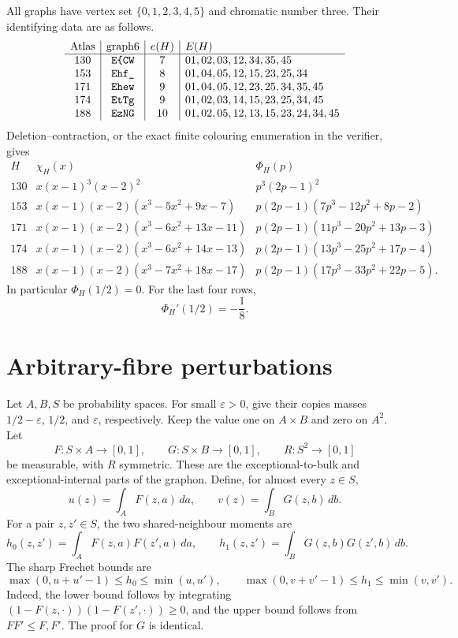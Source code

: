 \documentclass[11pt]{article}
\begin{document}
All graphs have vertex set $\{0,1,2,3,4,5\}$ and chromatic number three.
Their identifying data are as follows.
\[
\begin{array}{c|c|c|l}
\text{Atlas}&\text{graph6}&e(H)&E(H)\\ \hline
130&\texttt{E\char`\{CW}&7&01,02,03,12,34,35,45\\
153&\texttt{Ehf\_}&8&01,04,05,12,15,23,25,34\\
171&\texttt{Ehew}&9&01,04,05,12,23,25,34,35,45\\
174&\texttt{EtTg}&9&01,02,03,14,15,23,25,34,45\\
188&\texttt{EzNG}&10&01,02,05,12,13,15,23,24,34,45
\end{array}
\]
Deletion--contraction, or the exact finite colouring enumeration in the
verifier, gives
\[
\begin{array}{c|l|l}
H&\chi_H(x)&\Phi_H(p)\\ \hline
130&x(x-1)^3(x-2)^2&p^3(2p-1)^2\\
153&x(x-1)(x-2)(x^3-5x^2+9x-7)&
 p(2p-1)(7p^3-12p^2+8p-2)\\
171&x(x-1)(x-2)(x^3-6x^2+13x-11)&
 p(2p-1)(11p^3-20p^2+13p-3)\\
174&x(x-1)(x-2)(x^3-6x^2+14x-13)&
 p(2p-1)(13p^3-25p^2+17p-4)\\
188&x(x-1)(x-2)(x^3-7x^2+18x-17)&
 p(2p-1)(17p^3-33p^2+22p-5).
\end{array}
\]
In particular $\Phi_H(1/2)=0$.  For the last four rows,
\begin{equation}
 \Phi_H'(1/2)=-\frac18.
 \label{eq:negative-slope}
\end{equation}

\section{Arbitrary-fibre perturbations}

Let $A,B,S$ be probability spaces.  For small $\varepsilon>0$, give their
copies masses $1/2-\varepsilon$, $1/2$, and $\varepsilon$, respectively.
Keep the value one on $A\times B$ and zero on $A^2$.  Let
\[
 F:S\times A\longrightarrow[0,1],\qquad
 G:S\times B\longrightarrow[0,1],\qquad
 R:S^2\longrightarrow[0,1]
\]
be measurable, with $R$ symmetric.  These are the exceptional-to-bulk and
exceptional-internal parts of the graphon.  Define, for almost every $z\in S$,
\[
 u(z)=\int_A F(z,a)\,da,
 \qquad
 v(z)=\int_B G(z,b)\,db.
\]
For a pair $z,z'\in S$, the two shared-neighbour moments are
\[
 h_0(z,z')=\int_A F(z,a)F(z',a)\,da,
 \qquad
 h_1(z,z')=\int_B G(z,b)G(z',b)\,db.
\]
The sharp Frechet bounds are
\begin{equation}
 \max(0,u+u'-1)\leq h_0\leq\min(u,u'),
 \qquad
 \max(0,v+v'-1)\leq h_1\leq\min(v,v').
 \label{eq:frechet}
\end{equation}
Indeed, the lower bound follows by integrating
$(1-F(z,\cdot))(1-F(z',\cdot))\geq0$, and the upper bound follows from
$FF'\leq F,F'$.  The proof for $G$ is identical.
\end{document}
